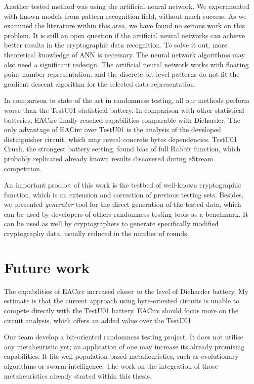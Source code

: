 \documentclass[
    digital,    %
    oneside,    %
    color,
    11pt,
    nocover,
    notable,
    nolof,
    nolot,
]{fithesis3}
\begin{document}
Another tested method was using the artificial neural network. We experimented with known models from pattern recognition field, without much success. As we examined the literature within this area, we have found no serious work on this problem. It is still an open question if the artificial neural networks can achieve better results in the cryptographic data recognition. To solve it out, more theoretical knowledge of ANN is necessary. The neural network algorithms may also need a significant redesign. The artificial neural network works with floating point number representation, and the discrete bit-level patterns do not fit the gradient descent algorithm for the selected data representation.

In comparison to state of the art in randomness testing, all our methods perform worse than the TestU01 statistical battery. In comparison with other statistical batteries, EACirc finally reached capabilities comparable with Dieharder. The only advantage of EACirc over TestU01 is the analysis of the developed distinguisher circuit, which may reveal concrete bytes dependencies. TestU01 Crush, the strongest battery setting, found bias of full Rabbit function, which probably replicated already known results discovered during eStream competition.

An important product of this work is the testbed of well-known cryptographic function, which is an extension and correction of previous testing sets. Besides, we presented \textit{generator} tool for the direct generation of the tested data, which can be used by developers of others randomness testing tools as a benchmark. It can be used as well by cryptographers to generate specifically modified cryptography data, usually reduced in the number of rounds.

\section{Future work}
\label{sec:conclusion-future}

The capabilities of EACirc increased closer to the level of Dieharder battery. My estimate is that the current approach using byte-oriented circuits is unable to compete directly with the TestU01 battery. EACirc should focus more on the circuit analysis, which offers an added value over the TestU01.

Our team develop a bit-oriented randomness testing project. It does not utilise any metaheuristic yet; an application of one may increase its already promising capabilities. It fits well population-based metaheuristics, such as evolutionary algorithms or swarm intelligence. The work on the integration of those metaheuristics already started within this thesis.
\end{document}
